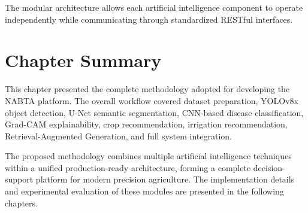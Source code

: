 The modular architecture allows each artificial intelligence component to operate independently while communicating through standardized RESTful interfaces.

\section{Chapter Summary}
\label{sec:chapter3_summary}

This chapter presented the complete methodology adopted for developing the NABTA platform. The overall workflow covered dataset preparation, YOLOv8x object detection, U-Net semantic segmentation, CNN-based disease classification, Grad-CAM explainability, crop recommendation, irrigation recommendation, Retrieval-Augmented Generation, and full system integration.

The proposed methodology combines multiple artificial intelligence techniques within a unified production-ready architecture, forming a complete decision-support platform for modern precision agriculture. The implementation details and experimental evaluation of these modules are presented in the following chapters.

